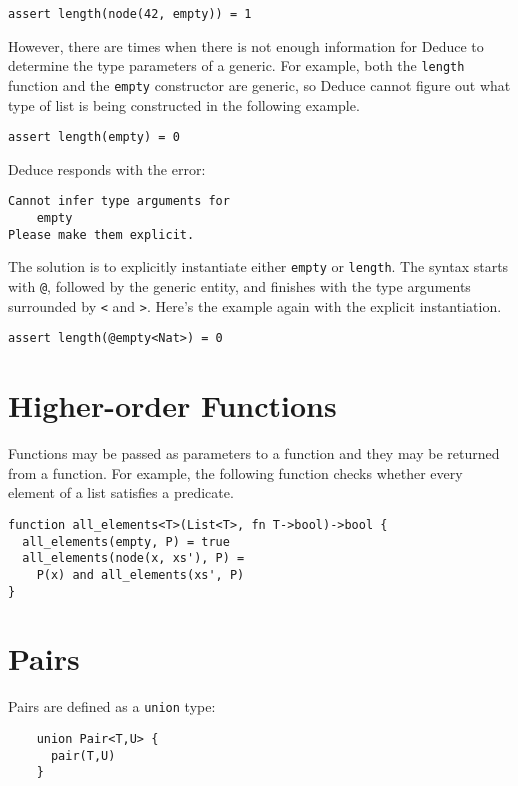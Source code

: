 \documentclass[12pt]{article}
\begin{document}
\begin{verbatim}
assert length(node(42, empty)) = 1
\end{verbatim}

However, there are times when there is not enough information for
Deduce to determine the type parameters of a generic. For example,
both the \texttt{length} function and the \texttt{empty} constructor
are generic, so Deduce cannot figure out what type of list is being
constructed in the following example.

\begin{verbatim}
assert length(empty) = 0
\end{verbatim}

Deduce responds with the error:

\begin{verbatim}
Cannot infer type arguments for
	empty
Please make them explicit.
\end{verbatim}

The solution is to explicitly instantiate either \texttt{empty} or \texttt{length}.
The syntax starts with \texttt{@}, followed by the generic entity, and finishes
with the type arguments surrounded by \texttt{<} and \texttt{>}. Here's the 
example again with the explicit instantiation.

\begin{verbatim}
assert length(@empty<Nat>) = 0
\end{verbatim}

\section{Higher-order Functions}

Functions may be passed as parameters to a function and they may be
returned from a function. For example, the following function checks
whether every element of a list satisfies a predicate.

\begin{verbatim}
function all_elements<T>(List<T>, fn T->bool)->bool {
  all_elements(empty, P) = true
  all_elements(node(x, xs'), P) = 
    P(x) and all_elements(xs', P)
}
\end{verbatim}

\section{Pairs}

Pairs are defined as a \texttt{union} type:

\begin{verbatim}
    union Pair<T,U> {
      pair(T,U)
    }
\end{verbatim}
\end{document}
